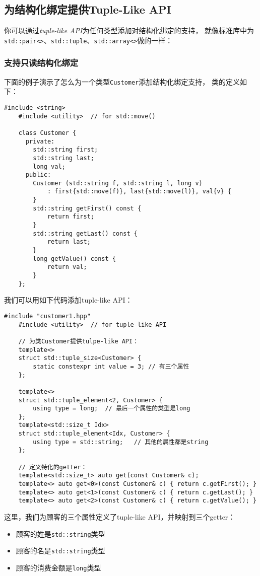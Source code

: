 \subsection{为结构化绑定提供Tuple-Like API}
你可以通过\emph{tuple-like API}为任何类型添加对结构化绑定的支持，
就像标准库中为\texttt{std::pair<>}、\texttt{std::tuple}、\texttt{std::array<>}做的一样：

\subsubsection*{支持只读结构化绑定}
下面的例子演示了怎么为一个类型\texttt{Customer}添加结构化绑定支持，
类的定义如下：
\begin{lstlisting}[frame=single, title=lang/customer1.hpp]
    #include <string>
    #include <utility>  // for std::move()

    class Customer {
      private:
        std::string first;
        std::string last;
        long val;
      public:
        Customer (std::string f, std::string l, long v)
            : first{std::move(f)}, last{std::move(l)}, val{v} {
        }
        std::string getFirst() const {
            return first;
        }
        std::string getLast() const {
            return last;
        }
        long getValue() const {
            return val;
        }
    };
\end{lstlisting}
我们可以用如下代码添加tuple-like API：
\begin{lstlisting}[frame=single, title=lang/structbind1.hpp]
    #include "customer1.hpp"
    #include <utility>  // for tuple-like API

    // 为类Customer提供tulpe-like API：
    template<>
    struct std::tuple_size<Customer> {
        static constexpr int value = 3; // 有三个属性
    };

    template<>
    struct std::tuple_element<2, Customer> {
        using type = long;  // 最后一个属性的类型是long
    };
    template<std::size_t Idx>
    struct std::tuple_element<Idx, Customer> {
        using type = std::string;   // 其他的属性都是string
    };

    // 定义特化的getter：
    template<std::size_t> auto get(const Customer& c);
    template<> auto get<0>(const Customer& c) { return c.getFirst(); }
    template<> auto get<1>(const Customer& c) { return c.getLast(); }
    template<> auto get<2>(const Customer& c) { return c.getValue(); }
\end{lstlisting}
这里，我们为顾客的三个属性定义了tuple-like API，并映射到三个getter：
\begin{itemize}[leftmargin=*]
    \item 顾客的姓是\texttt{std::string}类型
    \item 顾客的名是\texttt{std::string}类型
    \item 顾客的消费金额是\texttt{long}类型
\end{itemize}

